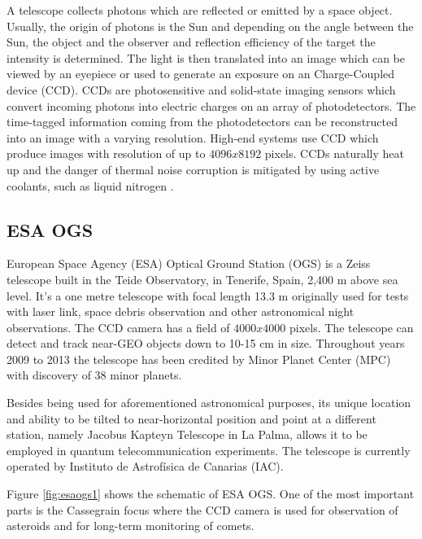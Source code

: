 	A telescope collects photons which are reflected or emitted by a space object. Usually, the origin of photons is the Sun and depending on the angle between the Sun, the object and the observer and reflection efficiency of the target the intensity is determined. The light is then translated into an image which can be viewed by an eyepiece or used to generate an exposure on an Charge-Coupled device (CCD). CCDs are photosensitive and solid-state imaging sensors which convert incoming photons into electric charges on an array of photodetectors. The time-tagged information coming from the photodetectors can be reconstructed into an image with a varying resolution. High-end systems use CCD which produce images with resolution of up to $4096 x 8192$ pixels. CCDs naturally heat up and the danger of thermal noise corruption is mitigated by using active coolants, such as liquid nitrogen \citep{klinkrad2006space}.

\subsection{ESA OGS}\label{subsec:esa_ogs}
European Space Agency (ESA) Optical Ground Station (OGS) is a Zeiss telescope built in the Teide Observatory, in Tenerife, Spain, 2,400 m above sea level. It's a one metre telescope with focal length 13.3 m originally used for tests with laser link, space debris observation and other astronomical night observations. The CCD camera has a field of $4000 x 4000$ pixels. The telescope can detect and track near-GEO objects down to 10-15 cm in size. Throughout years 2009 to 2013 the telescope has been credited by Minor Planet Center (MPC) with discovery of 38 minor planets.
 
	Besides being used for aforementioned astronomical purposes, its unique location and ability to be tilted to near-horizontal position and point at a different station, namely Jacobus Kapteyn Telescope in La Palma, allows it to be employed in quantum telecommunication experiments. The telescope is currently operated by Instituto de Astrofísica de Canarias (IAC).

	Figure \ref{fig:esaogs1} shows the schematic of ESA OGS. One of the most important parts is the Cassegrain focus where the CCD camera is used for observation of asteroids and for long-term monitoring of comets.


